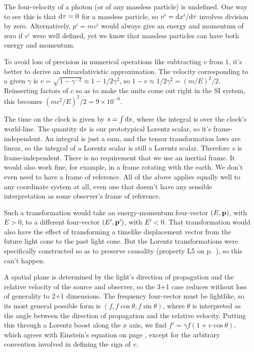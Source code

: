

The four-velocity of a photon (or of any massless particle) is undefined.
One way to see this is that $\textup{d}\tau=0$ for a massless particle, so $v^i=\textup{d} x^i/\textup{d}\tau$
involves division by zero. Alternatively, $p^i=mv^i$ would always give an energy and momentum
of zero if $v^i$ were well defined, yet we know that massless particles can have both energy and momentum.


To avoid loss of precision in numerical operations like subtracting $v$ from $1$,
it's better to derive an ultrarelativistic approximation. The velocity corresponding
to a given $\gamma$ is $v=\sqrt{1-\gamma^{-2}}\approx 1-1/2\gamma^2$, so
$1-v\approx 1/2\gamma^2=(m/E)^2/2$. Reinserting factors of $c$ so as to make the units
come out right in the SI system, this becomes $(mc^2/E)^2/2=9\times 10^{-9}$.


The time on the clock is given by $s=\int \textup{d} s$, where the integral is over the clock's
world-line. The quantity $\textup{d} s$ is our prototypical Lorentz scalar, so it's frame-independent.
An integral is just a sum, and the tensor transformation laws are linear, so the integral of
a Lorentz scalar is still a Lorentz scalar. Therefore $s$ is frame-independent. There is
no requirement that we use an inertial frame. It would also work fine, for example, in a frame
rotating with the earth. We don't even need to have a frame of reference.
All of the above applies equally well to any
coordinate system at all, even one that doesn't have any sensible interpretation as some
observer's frame of reference.


Such a transformation would take an energy-momentum four-vector $(E,\mathbf{p})$, with $E>0$, to
a different four-vector $(E',\mathbf{p}')$, with $E'<0$. That transformation would also have the
effect of transforming a timelike displacement vector from the future light cone to the past
light cone. But the Lorentz transformations were specifically constructed so as to preserve
causality (property L5 on p.~\pageref{sec:lorentz-geometry}), so this can't happen.


A spatial plane is determined by the light's direction of propagation and the relative velocity
of the source and observer, so the 3+1 case reduces without loss of generality to 2+1 dimensions.
The frequency four-vector must be lightlike, so its most general possible form is
$(f,f\cos\theta,f\sin\theta)$, where $\theta$ is interpreted as the angle between the direction of
propagation and the relative velocity. Putting this through a Lorentz boost along the $x$ axis,
we find $f'=\gamma f(1+v\cos\theta)$, which agrees with Einstein's equation on page
\pageref{einstein-doppler}, except for the arbitrary convention involved in defining the sign of $v$.


